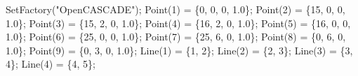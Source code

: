 \documentclass[11pt]{article}
\newenvironment{Shaded}{}{}
\newcommand{\DecValTok}[1]{\textcolor[rgb]{0.25,0.63,0.44}{{#1}}}
\newcommand{\FloatTok}[1]{\textcolor[rgb]{0.25,0.63,0.44}{{#1}}}
\newcommand{\StringTok}[1]{\textcolor[rgb]{0.25,0.44,0.63}{{#1}}}
\newcommand{\NormalTok}[1]{{#1}}
\newcommand{\OperatorTok}[1]{\textcolor[rgb]{0.40,0.40,0.40}{{#1}}}
\begin{document}
\begin{Shaded}
\begin{Highlighting}[]
\NormalTok{SetFactory}\OperatorTok{(}\StringTok{"OpenCASCADE"}\OperatorTok{);}
\NormalTok{Point}\OperatorTok{(}\DecValTok{1}\OperatorTok{)} \OperatorTok{=} \OperatorTok{\{}\DecValTok{0}\OperatorTok{,} \DecValTok{0}\OperatorTok{,} \DecValTok{0}\OperatorTok{,} \FloatTok{1.0}\OperatorTok{\};}
\NormalTok{Point}\OperatorTok{(}\DecValTok{2}\OperatorTok{)} \OperatorTok{=} \OperatorTok{\{}\DecValTok{15}\OperatorTok{,} \DecValTok{0}\OperatorTok{,} \DecValTok{0}\OperatorTok{,} \FloatTok{1.0}\OperatorTok{\};}
\NormalTok{Point}\OperatorTok{(}\DecValTok{3}\OperatorTok{)} \OperatorTok{=} \OperatorTok{\{}\DecValTok{15}\OperatorTok{,} \DecValTok{2}\OperatorTok{,} \DecValTok{0}\OperatorTok{,} \FloatTok{1.0}\OperatorTok{\};}
\NormalTok{Point}\OperatorTok{(}\DecValTok{4}\OperatorTok{)} \OperatorTok{=} \OperatorTok{\{}\DecValTok{16}\OperatorTok{,} \DecValTok{2}\OperatorTok{,} \DecValTok{0}\OperatorTok{,} \FloatTok{1.0}\OperatorTok{\};}
\NormalTok{Point}\OperatorTok{(}\DecValTok{5}\OperatorTok{)} \OperatorTok{=} \OperatorTok{\{}\DecValTok{16}\OperatorTok{,} \DecValTok{0}\OperatorTok{,} \DecValTok{0}\OperatorTok{,} \FloatTok{1.0}\OperatorTok{\};}
\NormalTok{Point}\OperatorTok{(}\DecValTok{6}\OperatorTok{)} \OperatorTok{=} \OperatorTok{\{}\DecValTok{25}\OperatorTok{,} \DecValTok{0}\OperatorTok{,} \DecValTok{0}\OperatorTok{,} \FloatTok{1.0}\OperatorTok{\};}
\NormalTok{Point}\OperatorTok{(}\DecValTok{7}\OperatorTok{)} \OperatorTok{=} \OperatorTok{\{}\DecValTok{25}\OperatorTok{,} \DecValTok{6}\OperatorTok{,} \DecValTok{0}\OperatorTok{,} \FloatTok{1.0}\OperatorTok{\};}
\NormalTok{Point}\OperatorTok{(}\DecValTok{8}\OperatorTok{)} \OperatorTok{=} \OperatorTok{\{}\DecValTok{0}\OperatorTok{,} \DecValTok{6}\OperatorTok{,} \DecValTok{0}\OperatorTok{,} \FloatTok{1.0}\OperatorTok{\};}
\NormalTok{Point}\OperatorTok{(}\DecValTok{9}\OperatorTok{)} \OperatorTok{=} \OperatorTok{\{}\DecValTok{0}\OperatorTok{,} \DecValTok{3}\OperatorTok{,} \DecValTok{0}\OperatorTok{,} \FloatTok{1.0}\OperatorTok{\};}
\NormalTok{Line}\OperatorTok{(}\DecValTok{1}\OperatorTok{)} \OperatorTok{=} \OperatorTok{\{}\DecValTok{1}\OperatorTok{,} \DecValTok{2}\OperatorTok{\};}
\NormalTok{Line}\OperatorTok{(}\DecValTok{2}\OperatorTok{)} \OperatorTok{=} \OperatorTok{\{}\DecValTok{2}\OperatorTok{,} \DecValTok{3}\OperatorTok{\};}
\NormalTok{Line}\OperatorTok{(}\DecValTok{3}\OperatorTok{)} \OperatorTok{=} \OperatorTok{\{}\DecValTok{3}\OperatorTok{,} \DecValTok{4}\OperatorTok{\};}
\NormalTok{Line}\OperatorTok{(}\DecValTok{4}\OperatorTok{)} \OperatorTok{=} \OperatorTok{\{}\DecValTok{4}\OperatorTok{,} \DecValTok{5}\OperatorTok{\};}

\end{Highlighting}
\end{Shaded}
\end{document}
